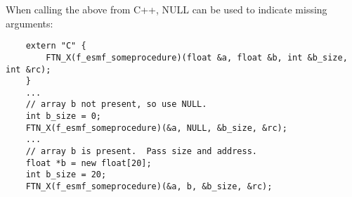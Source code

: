 When calling the above from C++, NULL can be used to indicate missing arguments:

\begin{verbatim}
    extern "C" {
        FTN_X(f_esmf_someprocedure)(float &a, float &b, int &b_size, int &rc);
    }
    ...
    // array b not present, so use NULL.
    int b_size = 0;
    FTN_X(f_esmf_someprocedure)(&a, NULL, &b_size, &rc);
    ...
    // array b is present.  Pass size and address.
    float *b = new float[20];
    int b_size = 20;
    FTN_X(f_esmf_someprocedure)(&a, b, &b_size, &rc);
\end{verbatim}


